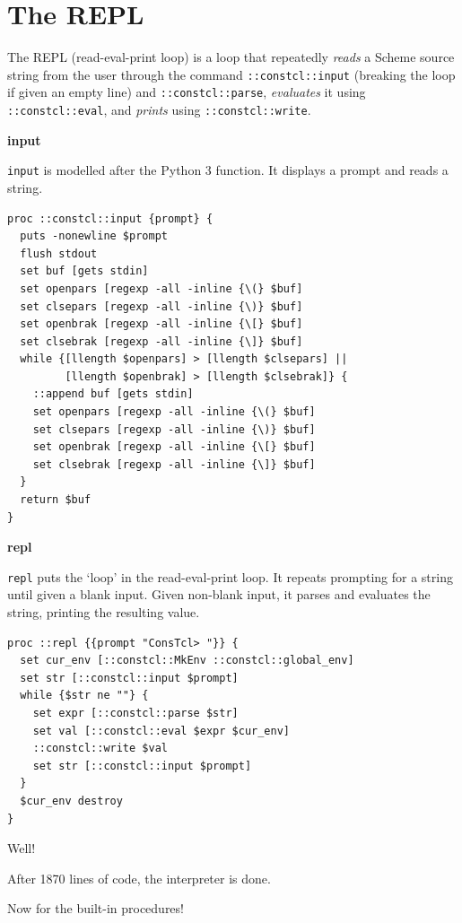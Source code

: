 \documentclass[twoside]{report}
\begin{document}
\chapter{The REPL}
\label{the-repl}

The REPL (read-eval-print loop) is a loop that repeatedly \emph{reads} a Scheme source string from the user through the command \texttt{::constcl::input} (breaking the loop if given an empty line) and \texttt{::constcl::parse}, \emph{evaluates} it using \texttt{::constcl::eval}, and \emph{prints} using \texttt{::constcl::write}.

\textbf{input}

\texttt{input} is modelled after the Python 3 function. It displays a prompt and reads a string.

\begin{lstlisting}
proc ::constcl::input {prompt} {
  puts -nonewline $prompt
  flush stdout
  set buf [gets stdin]
  set openpars [regexp -all -inline {\(} $buf]
  set clsepars [regexp -all -inline {\)} $buf]
  set openbrak [regexp -all -inline {\[} $buf]
  set clsebrak [regexp -all -inline {\]} $buf]
  while {[llength $openpars] > [llength $clsepars] ||
         [llength $openbrak] > [llength $clsebrak]} {
    ::append buf [gets stdin]
    set openpars [regexp -all -inline {\(} $buf]
    set clsepars [regexp -all -inline {\)} $buf]
    set openbrak [regexp -all -inline {\[} $buf]
    set clsebrak [regexp -all -inline {\]} $buf]
  }
  return $buf
}
\end{lstlisting}

\textbf{repl}

\texttt{repl} puts the `loop' in the read-eval-print loop. It repeats prompting for a string until given a blank input. Given non-blank input, it parses and evaluates the string, printing the resulting value.

\begin{lstlisting}
proc ::repl {{prompt "ConsTcl> "}} {
  set cur_env [::constcl::MkEnv ::constcl::global_env]
  set str [::constcl::input $prompt]
  while {$str ne ""} {
    set expr [::constcl::parse $str]
    set val [::constcl::eval $expr $cur_env]
    ::constcl::write $val
    set str [::constcl::input $prompt]
  }
  $cur_env destroy
}
\end{lstlisting}

Well!

After 1870 lines of code, the interpreter is done.

Now for the built-in procedures!
\end{document}
